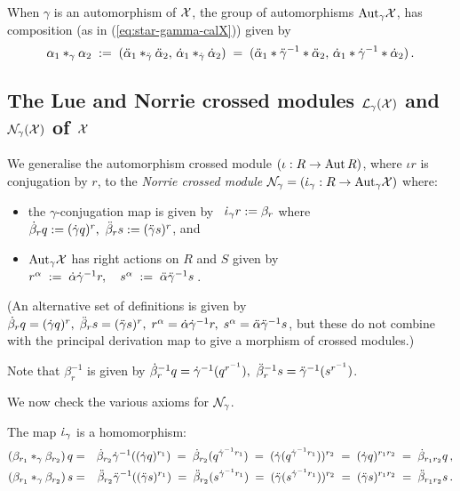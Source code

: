 \bigskip
When $\gamma$ is an automorphism of $\mathcal{X}$, 
the group of automorphisms $\mathrm{Aut}_{\gamma}\mathcal{X}$, 
has composition (as in (\ref{eq:star-gamma-calX})) given by 
$$
\alpha_1 \ast_{\gamma} \alpha_2 
\;:=\; 
(\ddot{\alpha}_1 \ast_{\ddot{\gamma}} \ddot{\alpha}_2,\, \dot{\alpha}_1 \ast_{\dot{\gamma}} \dot{\alpha}_2) 
\;=\; 
(\ddot{\alpha}_1 * \ddot{\gamma}^{-1} * \ddot{\alpha}_2,\, \dot{\alpha}_1 * \dot{\gamma}^{-1} * \dot{\alpha}_2)\,. 
$$

\subsection{The Lue and Norrie crossed modules 
$\mathcal{L}_{\gamma}(\mathcal{X})$ and $\mathcal{N}_{\gamma}(\mathcal{X})$ of $\mathcal{X}$} 
\label{subs:SR-to-autX} 

We generalise the automorphism crossed module 
$(\iota : R \to \mathrm{Aut}\,R)$, where $\iota r$ is conjugation by $r$, 
to the \emph{Norrie crossed module} 
$\mathcal{N}_{\gamma} = (\dot{\iota}_{\gamma} : R \to \mathrm{Aut}_{\gamma}\mathcal{X})$ where: 
\begin{itemize} 
\item 
the $\gamma$-conjugation map is given by~ 
$\dot{\iota}_{\gamma}r := \beta_r$ where 
$\dot{\beta}_r q := (\dot{\gamma} q)^r,~ 
 \ddot{\beta}_r s := (\ddot{\gamma} s)^r$, and 
\item 
$\mathrm{Aut}_{\gamma}\mathcal{X}$ has right actions on $R$ and $S$ given by~ 
$r^{\alpha} \;:=\; \dot{\alpha} \dot{\gamma}^{-1} r, \quad 
 s^{\alpha} \;:=\; \ddot{\alpha} \ddot{\gamma}^{-1} s$\,. 
\end{itemize} 
(An alternative set of definitions is given by 
$\dot{\beta}_r q = (\dot{\gamma} q)^r,\; 
 \ddot{\beta}_r s = (\ddot{\gamma} s)^r,\; 
 r^{\alpha} = \dot{\alpha}\dot{\gamma}^{-1}r,\; 
 s^{\alpha} = \ddot{\alpha}\ddot{\gamma}^{-1}s$, 
but these do not combine with the principal derivation map 
to give a morphism of crossed modules.) 

\noindent 
Note that $\beta_r^{-1}$ is given by 
$\dot{\beta}_r^{-1}q = \dot{\gamma}^{-1}(q^{r^{-1}}),~ \ddot{\beta}_r^{-1}s = \ddot{\gamma}^{-1}(s^{r^{-1}})$. 

\medskip\noindent
We now check the various axioms for $\mathcal{N}_{\gamma}$. 

\noindent 
The map $\dot{\iota}_{\gamma}$ is a homomorphism: 
\begin{eqnarray*} 
\left( \beta_{r_1} \ast_{\gamma} \beta_{r_2} \right)q 
 & = & \dot{\beta}_{r_2} \dot{\gamma}^{-1} ((\dot{\gamma} q)^{r_1}) 
 \;=\; \dot{\beta}_{r_2} (q^{\dot{\gamma}^{-1}r_1}) 
 \;=\; (\dot{\gamma} (q^{\dot{\gamma}^{-1}r_1}))^{r_2} 
 \;=\; (\dot{\gamma} q)^{r_1r_2} 
 \;=\; \dot{\beta}_{r_1r_2} q\,, \\ 
\left( \beta_{r_1} \ast_{\gamma} \beta_{r_2} \right)s 
 & = & \ddot{\beta}_{r_2} \ddot{\gamma}^{-1} ((\ddot{\gamma} s)^{r_1}) 
 \;=\; \ddot{\beta}_{r_2} (s^{\dot{\gamma}^{-1}r_1}) 
 \;=\; (\ddot{\gamma} (s^{\dot{\gamma}^{-1}r_1}))^{r_2} 
 \;=\; (\ddot{\gamma} s)^{r_1r_2}  
 \;=\; \ddot{\beta}_{r_1r_2} s\,. 
\end{eqnarray*}

